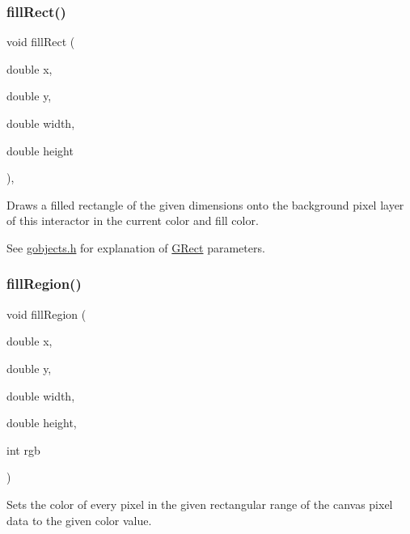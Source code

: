 \subsubsection{\texorpdfstring{fill\+Rect()}{fillRect()}\hspace{0.1cm}{\footnotesize\ttfamily [2/2]}}
{\footnotesize\ttfamily void fill\+Rect (\begin{DoxyParamCaption}\item[{double}]{x,  }\item[{double}]{y,  }\item[{double}]{width,  }\item[{double}]{height }\end{DoxyParamCaption})\hspace{0.3cm}{\ttfamily [virtual]}, {\ttfamily [inherited]}}



Draws a filled rectangle of the given dimensions onto the background pixel layer of this interactor in the current color and fill color. 

See \mbox{\hyperlink{gobjects_8h_source}{gobjects.\+h}} for explanation of \mbox{\hyperlink{classsgl_1_1GRect}{G\+Rect}} parameters. \mbox{\label{classsgl_1_1GCanvas_af4146bdcb26135b739b9b4f13db03435}} 
\subsubsection{\texorpdfstring{fill\+Region()}{fillRegion()}\hspace{0.1cm}{\footnotesize\ttfamily [1/2]}}
{\footnotesize\ttfamily void fill\+Region (\begin{DoxyParamCaption}\item[{double}]{x,  }\item[{double}]{y,  }\item[{double}]{width,  }\item[{double}]{height,  }\item[{int}]{rgb }\end{DoxyParamCaption})\hspace{0.3cm}{\ttfamily [virtual]}}



Sets the color of every pixel in the given rectangular range of the canvas pixel data to the given color value. 


